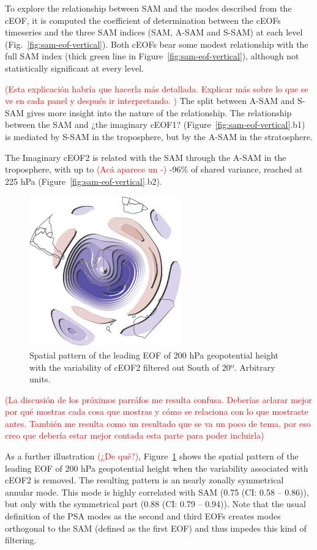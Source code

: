 \documentclass[smallextended]{svjour3}       %
\begin{document}
To explore the relationship between SAM and the modes described from the cEOF, it is computed the coefficient of determination between the cEOFs timeseries and the three SAM indices (SAM, A-SAM and S-SAM) at each level (Fig.~\ref{fig:sam-eof-vertical}). Both cEOFs bear some modest relationship with the full SAM index (thick green line in Figure~\ref{fig:sam-eof-vertical}), although not statistically significant at every level.

\textcolor{red}{(Esta explicación habría que hacerla más detallada. Explicar más sobre lo que se ve en cada panel y después ir interpretando.  )}
The split between A-SAM and S-SAM gives more insight into the nature of the relationship. The relationship between the SAM and ¿the imaginary cEOF1? (Figure~\ref{fig:sam-eof-vertical}.b1) is mediated by S-SAM in the troposphere, but by the A-SAM in the stratosphere.

The Imaginary cEOF2 is related with the SAM through the A-SAM in the troposphere, with up to \textcolor{red}{(Acá aparece un -)} -96\% of shared variance, reached at 225 hPa (Figure~\ref{fig:sam-eof-vertical}.b2).

\begin{figure}
\centering
\includegraphics{../figures/eof-filtered-1.pdf}
\caption{\label{fig:eof-filtered}Spatial pattern of the leading EOF of 200 hPa geopotential height with the variability of cEOF2 filtered out South of 20º. Arbitrary units.}
\end{figure}

\textcolor{red}{(La discusión de los próximos parráfos me resulta confusa. Deberías aclarar mejor por qué mostras cada cosa que mostras y cómo se relaciona con lo que mostraste antes. También me resulta como un resultado que se va un poco de tema, por eso creo que debería estar mejor contada esta parte para poder incluirla)}

As a further illustration \textcolor{red}{(¿De qué?)}, Figure~\ref{fig:eof-filtered} shows the spatial pattern of the leading EOF of 200 hPa geopotential height when the variability associated with cEOF2 is removed. The resulting pattern is an nearly zonally symmetrical annular mode. This mode is highly correlated with SAM (0.75 (CI: 0.58 -- 0.86)), but only with the symmetrical part (0.88 (CI: 0.79 -- 0.94)). Note that the usual definition of the PSA modes as the second and third EOFs creates modes orthogonal to the SAM (defined as the first EOF) and thus impedes this kind of filtering.
\end{document}
